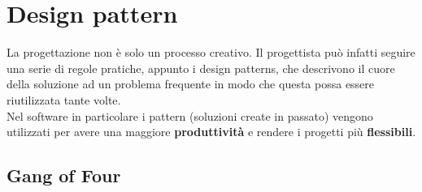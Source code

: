 \newpage
\section{Design pattern}
La progettazione non è solo un processo creativo. Il progettista può infatti seguire una serie di regole pratiche, appunto i design patterns, che descrivono il cuore della soluzione ad un problema frequente in modo che questa possa essere riutilizzata tante volte.\\

Nel software in particolare i pattern (soluzioni create in passato) vengono utilizzati per avere una maggiore \textbf{produttività} e rendere i progetti più \textbf{flessibili}.\\

\subsection{Gang of Four}
